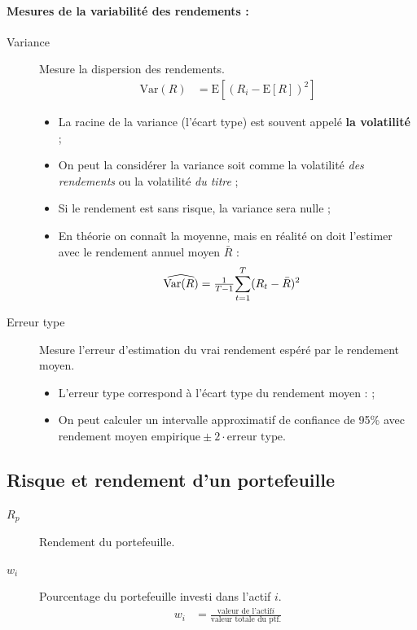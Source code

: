 \documentclass[10pt, french]{article}
\begin{document}
\begin{multicols*}{2}
\paragraph*{Mesures de la variabilité des rendements :}
\begin{description}
	\item[Variance]	Mesure la dispersion des rendements.
		\begin{align*}
		\text{Var}(R)
		&=	\text{E}[(R_{i}	-	\text{E}[R]	)^{2}]
		\end{align*}
		\begin{itemize}
		\item	La racine de la variance (l'écart type) est souvent appelé \textbf{la volatilité} ;
		\item	On peut la considérer la variance soit comme la volatilité \textit{des rendements} ou la volatilité \textit{du titre} ;
		\item	Si le rendement est sans risque, la variance sera nulle ;
		\item	En théorie on connaît la moyenne, mais en réalité on doit l'estimer avec le rendement annuel moyen $\bar{R}$ :
			\begin{align*}
			\widehat{\text{Var}(R)}
			&=	\tfrac{1}{T	-	1} \overset{T}{\underset{t	=	1}{\sum}}(R_{t}	-	\bar{R})^{2}
			\end{align*}
		\end{itemize}
	\item[Erreur type]	Mesure l'erreur d'estimation du vrai rendement espéré par le rendement moyen.
		\begin{itemize}
		\item	L'erreur type correspond à l'écart type du rendement moyen :  ;
		\item	On peut calculer un intervalle approximatif de confiance de 95\% avec $\text{rendement moyen empirique} \pm 2 \cdot \text{erreur type}$.
		\end{itemize}
\end{description}


\columnbreak
\subsection{Risque et rendement d'un portefeuille}
\begin{distributions}[Notation]
\begin{description}
	\item[$R_{p}$]	Rendement du portefeuille.
	\item[$w_{i}$]	Pourcentage du portefeuille investi dans l'actif $i$.
		\begin{align*}
		w_{i}
		&=	\frac{\text{valeur de l'actif} i}{\text{valeur totale du ptf.}}
		\end{align*}
\end{description}
\end{distributions}


\end{multicols*}
\end{document}
